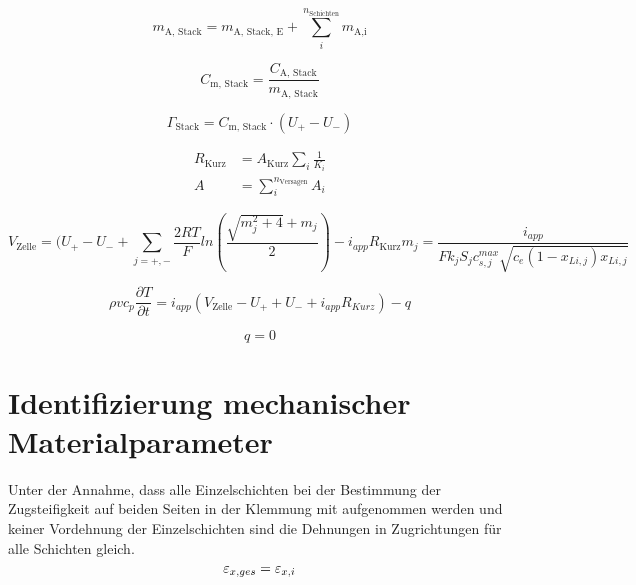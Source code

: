 \begin{equation}
    m_{\text{A, Stack}} = m_{\text{A, Stack, E}} + \sum_{i}^{n_{\text{Schichten}}} m_{\text{A,i}} 
\end{equation}

\begin{equation}
    C_{\text{m, Stack}} = \frac{C_{\text{A, Stack}} }{ m_{\text{A, Stack}}}
\end{equation}

\begin{equation}
    \Gamma_{\text{Stack}} = C_{\text{m, Stack}} \cdot \left(U_{+} - U_{-}\right)
\end{equation}

\begin{align}
    R_{\text{Kurz}} &= A_{\text{Kurz}} \sum_{i} \frac{1}{K_i}\\
    A &= \sum_{i}^{n_{\text{Versagen}}} A_{i}
\end{align}

\begin{equation}
    V_{\text{Zelle}} = (U_{+} - U_{-} + \sum_{j=+,-} \frac{2 RT}{F} ln\left(\frac{\sqrt{m_j^2 +4} + m_j}{2}\right) - i_{app} R_{\text{Kurz}}
    m_j = \frac{i_{app}}{F k_j S_j c_{s,j}^{max} \sqrt{c_e (1-x_{Li,j}) x_{Li,j}}} 
\end{equation}

\begin{equation}
    \rho v c_p \frac{\partial T}{\partial t} = i_{app}\left(V_{\text{Zelle}} - U_{+} + U_{-} + i_{app} R_{Kurz} \right) -q
\end{equation}

\begin{equation}
    q = 0
\end{equation}

\section{\label{sec:improve_mech}Identifizierung mechanischer Materialparameter}
Unter der Annahme, dass alle Einzelschichten bei der Bestimmung der Zugsteifigkeit auf beiden Seiten in der Klemmung mit aufgenommen werden und keiner Vordehnung der Einzelschichten sind die Dehnungen in Zugrichtungen für alle Schichten gleich.
\begin{equation}
    \varepsilon_{x,ges} = \varepsilon_{x,i}\\
\end{equation}



